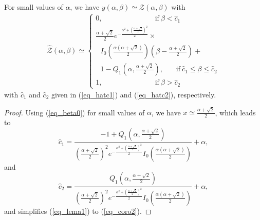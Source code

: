 \begin{corollary}\label{coro2}
For small values of $\alpha$, we have  $y(\alpha,\beta)\simeq\hat{ \mathcal{Z}}(\alpha,\beta)$ with
\begin{align}\label{eq_coro2}
\hat{ \mathcal{Z}}(\alpha,\beta)\simeq
\begin{cases}
0,   ~~~~~~~~~~~~~~~~~~~~~~~~~~~~~~~~~\mathrm{if}~\beta < \hat{c}_1  \\ 
\frac{\alpha+\sqrt{2}}{2}  e^{-\frac{\alpha^2+\left(\frac{\alpha+\sqrt{2}}{2}\right)^2}{2}}\times\\
~~~I_0\left(\frac{\alpha(\alpha+\sqrt{2})}{2}\right)(\beta-\frac{\alpha+\sqrt{2}}{2}) + \\
~~~1-Q_1\left(\alpha,\frac{\alpha+\sqrt{2}}{2}\right), 
~~~~~~~~\mathrm{if}~\hat{c}_1 \leq\beta\leq \hat{c}_2 \\
1, ~~~~~~~~~~~~~~~~~~~~~~~~~~~~~~~~~\mathrm{if}~ \beta> \hat{c}_2
\end{cases}
\end{align}
with $\hat{c}_1$ and $\hat{c}_2$ given in (\ref{eq_hatc1}) and (\ref{eq_hatc2}), respectively.
\end{corollary}
\begin{proof}
Using (\ref{eq_beta0}) for small values of $\alpha$, we have $x\simeq \frac{\alpha+\sqrt{2}}{2}$, which leads to 
\begin{equation}\label{eq_hatc1}
    \hat{c}_1 = \frac{-1+Q_1\left(\alpha,\frac{\alpha+\sqrt{2}}{2}\right)}{\left(\frac{\alpha+\sqrt{2}}{2} \right)^2 e^{-\frac{\alpha^2+\left(\frac{\alpha+\sqrt{2}}{2}\right)^2}{2}} I_0\left(\frac{\alpha(\alpha+\sqrt{2})}{2}\right)}+\alpha,
\end{equation}
and
\begin{equation}\label{eq_hatc2}
    \hat{c}_2 = \frac{Q_1\left(\alpha,\frac{\alpha+\sqrt{2}}{2}\right)}{\left(\frac{\alpha+\sqrt{2}}{2} \right)^2 e^{-\frac{\alpha^2+\left(\frac{\alpha+\sqrt{2}}{2}\right)^2}{2}} I_0\left(\frac{\alpha(\alpha+\sqrt{2})}{2}\right)}+\alpha,
\end{equation}
and simplifies (\ref{eq_lema1}) to (\ref{eq_coro2}).
\end{proof}



